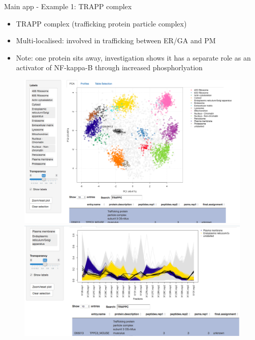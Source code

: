 \documentclass[bigger]{beamer}
\begin{document}
\begin{frame}{Main app - Example 1: TRAPP complex}
\smallskip
\footnotesize {
  \begin{itemize} 
  \item TRAPP complex (trafficking protein particle complex)
  \item Multi-localised: involved in trafficking between ER/GA and PM
  \item Note: one protein sits away, investigation shows it has a separate  role 
  as an activator of NF-kappa-B through increased phosphorlyation 
  \end{itemize}
  }
  \begin{figure}
    \includegraphics[width=.5\linewidth]{Figures/demo1-trapp-pca.png}
    \includegraphics[width=.5\linewidth]{Figures/demo1-trapp-profiles.png}
  \end{figure}
\end{frame}
\end{document}
